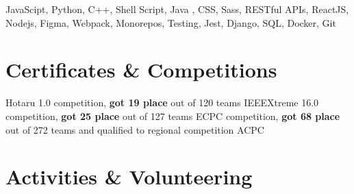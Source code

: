 \documentclass[legalpaper, oneside, final]{scrartcl}
\begin{document}
\begin{center}
\parbox{\linewidth} {
JavaScipt, Python, C++, Shell Script, Java , CSS, Sass, RESTful APIs, ReactJS, Nodejs, Figma, Webpack, Monorepos, Testing, Jest, Django, SQL, Docker, Git
}


%
%


\section{Certificates \& Competitions}

\begin{datelist}
    {\quad Hotaru 1.0 competition, \textbf{got 19 place} out of 120 teams}
    {\quad IEEEXtreme 16.0 competition, \textbf{got 25 place} out of 127 teams}
    {\quad ECPC competition, \textbf{got 68 place} out of 272 teams and qualified to regional competition ACPC}
\end{datelist}


\section{Activities \& Volunteering}


\end{center}
\end{document}
